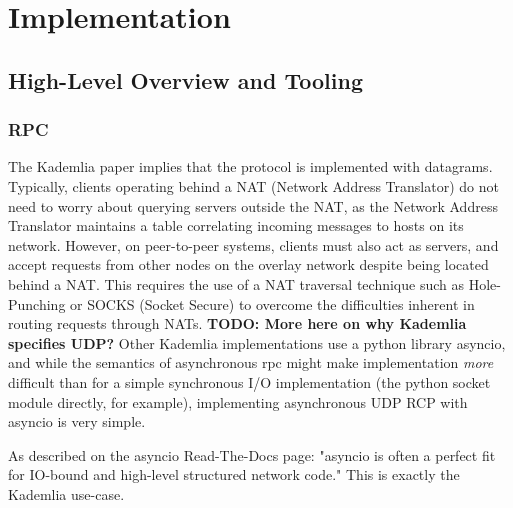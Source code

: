 \documentclass[12pt]{report}
\begin{document}
    \section{Implementation}
        \subsection{High-Level Overview and Tooling}
            \subsubsection{RPC}
                The Kademlia paper implies that the protocol is implemented
                with datagrams\cite{kademlia}.  Typically, clients operating
                behind a NAT (Network Address Translator) do not need to worry
                about querying servers outside the NAT, as the Network Address
                Translator maintains a table correlating incoming messages to
                hosts on its network.  However, on peer-to-peer systems,
                clients must also act as servers, and accept requests from
                other nodes on the overlay network despite being located behind
                a NAT.  This requires the use of a NAT traversal technique such
                as Hole-Punching or SOCKS (Socket Secure) to overcome the
                difficulties inherent in routing requests through NATs.
                \textbf{TODO:
                More here on why Kademlia specifies UDP?}  Other Kademlia
                implementations use a python library asyncio, and while the
                semantics of asynchronous rpc might make implementation
                \textit{more} difficult than for a simple synchronous I/O
                implementation (the python socket module directly, for
                example), implementing asynchronous UDP RCP with asyncio is
                very simple.

                As described on the asyncio Read-The-Docs page: "asyncio is
                often a perfect fit for IO-bound and high-level structured
                network code." This is exactly the Kademlia use-case.
\end{document}
